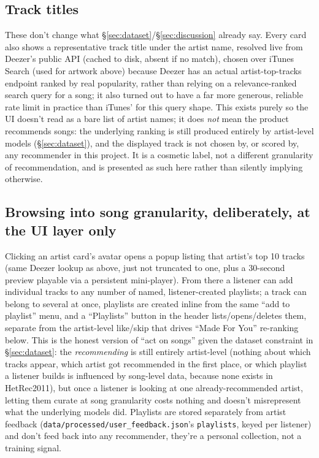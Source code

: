 \documentclass[11pt,a4paper]{article}
\newcommand{\code}[1]{\texttt{#1}}
\newcommand{\secref}[1]{\S\ref{#1}}
\begin{document}
\subsection{Track titles}

These don't change what \secref{sec:dataset}/\secref{sec:discussion} already say. Every card also shows a representative track title under the artist name, resolved live from Deezer's public API (cached to disk, absent if no match), chosen over iTunes Search (used for artwork above) because Deezer has an actual artist-top-tracks endpoint ranked by real popularity, rather than relying on a relevance-ranked search query for a song; it also turned out to have a far more generous, reliable rate limit in practice than iTunes' for this query shape. This exists purely so the UI doesn't read as a bare list of artist names; it does \emph{not} mean the product recommends songs: the underlying ranking is still produced entirely by artist-level models (\secref{sec:dataset}), and the displayed track is not chosen by, or scored by, any recommender in this project. It is a cosmetic label, not a different granularity of recommendation, and is presented as such here rather than silently implying otherwise.

\subsection{Browsing into song granularity, deliberately, at the UI layer only}

Clicking an artist card's avatar opens a popup listing that artist's top 10 tracks (same Deezer lookup as above, just not truncated to one, plus a 30-second preview playable via a persistent mini-player). From there a listener can add individual tracks to any number of named, listener-created playlists; a track can belong to several at once, playlists are created inline from the same ``add to playlist'' menu, and a ``Playlists'' button in the header lists/opens/deletes them, separate from the artist-level like/skip that drives ``Made For You'' re-ranking below. This is the honest version of ``act on songs'' given the dataset constraint in \secref{sec:dataset}: the \emph{recommending} is still entirely artist-level (nothing about which tracks appear, which artist got recommended in the first place, or which playlist a listener builds is influenced by song-level data, because none exists in HetRec2011), but once a listener is looking at one already-recommended artist, letting them curate at song granularity costs nothing and doesn't misrepresent what the underlying models did. Playlists are stored separately from artist feedback (\code{data/processed/user\_feedback.json}'s \code{playlists}, keyed per listener) and don't feed back into any recommender, they're a personal collection, not a training signal.
\end{document}
